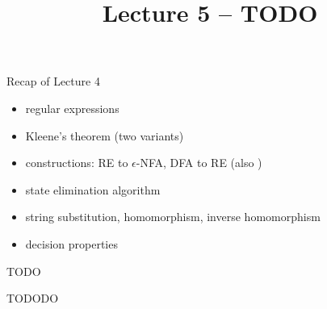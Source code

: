 \documentclass[handout]{beamer}
\title{Lecture 5 -- TODO}
\begin{document}
\frame{\titlepage}


\begin{frame}{Recap of Lecture 4}

    \begin{itemize}
        \item regular expressions
        \item Kleene's theorem (two variants)
        \item constructions: RE to $\epsilon$-NFA, DFA to RE (also )
        \item state elimination algorithm
        \item string substitution, homomorphism, inverse homomorphism
        \item decision properties
    \end{itemize}

\end{frame}

\begin{frame}{TODO}

    TODODO

\end{frame}
\end{document}
